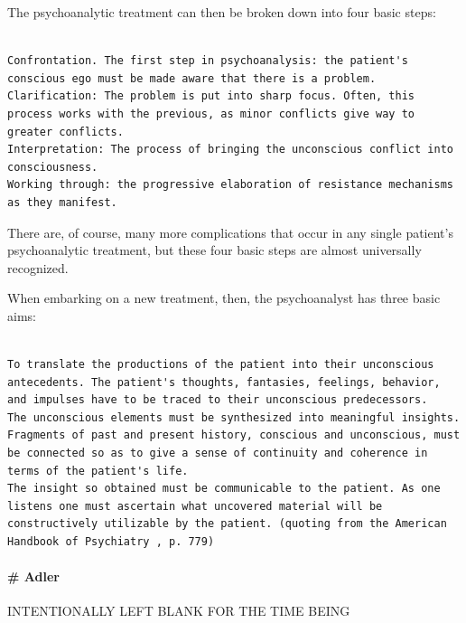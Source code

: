 The psychoanalytic treatment can then be broken down into four basic steps:

\begin{adjustwidth}{2.5em}{2.5em}
\begin{verbatim}

Confrontation. The first step in psychoanalysis: the patient's conscious ego must be made aware that there is a problem.  
Clarification: The problem is put into sharp focus. Often, this process works with the previous, as minor conflicts give way to greater conflicts.
Interpretation: The process of bringing the unconscious conflict into consciousness.
Working through: the progressive elaboration of resistance mechanisms as they manifest.

\end{verbatim}
\end{adjustwidth}

There are, of course, many more complications that occur in any single patient's psychoanalytic treatment, but these four basic steps are almost universally recognized.

When embarking on a new treatment, then, the psychoanalyst has three basic aims:

\begin{adjustwidth}{2.5em}{2.5em}
\begin{verbatim}

To translate the productions of the patient into their unconscious antecedents. The patient's thoughts, fantasies, feelings, behavior, and impulses have to be traced to their unconscious predecessors.
The unconscious elements must be synthesized into meaningful insights. Fragments of past and present history, conscious and unconscious, must be connected so as to give a sense of continuity and coherence in terms of the patient's life.
The insight so obtained must be communicable to the patient. As one listens one must ascertain what uncovered material will be constructively utilizable by the patient. (quoting from the American Handbook of Psychiatry , p. 779)

\end{verbatim}
\end{adjustwidth}

\paragraph{\# Adler}
\label{adler}

INTENTIONALLY LEFT BLANK FOR THE TIME BEING

